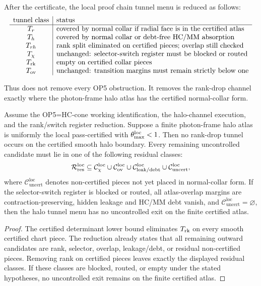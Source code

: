 After the certificate, the local proof chain tunnel menu is reduced as follows:
\[
\begin{array}{c|l}
\text{tunnel class} & \text{status}\\
\hline
T_r & \text{covered by normal collar if radial face is in the certified atlas}\\
T_h & \text{covered by normal collar or debt-free HC/MM absorption}\\
T_{rh} & \text{rank split eliminated on certified pieces; overlap still checked}\\
T_\chi & \text{unchanged: selector-switch register must be blocked or routed}\\
T_{\mathrm{rk}} & \text{empty on certified collar pieces}\\
T_{\mathrm{ov}} & \text{unchanged: transition margins must remain strictly below one}
\end{array}
\]

Thus does not remove every OP5 obstruction. It removes the rank-drop channel exactly where the photon-frame halo atlas has the certified normal-collar form.

\begin{theorem}
Assume the OP5=HC-cone working identification, the halo-channel execution, and the rank/switch register reduction. Suppose a finite photon-frame halo atlas is uniformly the local pass-certified with \(\theta_{\max}^{\mathrm{loc}}<1\). Then no rank-drop tunnel occurs on the certified smooth halo boundary. Every remaining uncontrolled candidate must lie in one of the following residual classes:
\[
\mathcal R_{\mathrm{res}}^{\mathrm{loc}}
\subseteq
\mathcal C_{\chi}^{\mathrm{loc}}
\cup
\mathcal C_{\mathrm{ov}}^{\mathrm{loc}}
\cup
\mathcal C_{\mathrm{leak/debt}}^{\mathrm{loc}}
\cup
\mathcal C_{\mathrm{uncert}}^{\mathrm{loc}},
\]
where \(\mathcal C_{\mathrm{uncert}}^{\mathrm{loc}}\) denotes non-certified pieces not yet placed in normal-collar form.
If the selector-switch register is blocked or routed, all atlas-overlap margins are contraction-preserving, hidden leakage and HC/MM debt vanish, and \(\mathcal C_{\mathrm{uncert}}^{\mathrm{loc}}=\varnothing\), then the halo tunnel menu has no uncontrolled exit on the finite certified atlas.
\end{theorem}

\begin{proof}
The certified determinant lower bound eliminates \(T_{\mathrm{rk}}\) on every smooth certified chart piece. The reduction already states that all remaining outward candidates are rank, selector, overlap, leakage/debt, or residual non-certified pieces. Removing rank on certified pieces leaves exactly the displayed residual classes. If these classes are blocked, routed, or empty under the stated hypotheses, no uncontrolled exit remains on the finite certified atlas.
\end{proof}

